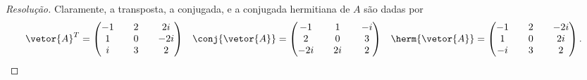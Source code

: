 \begin{proof}[Resolução]
    Claramente, a transposta, a conjugada, e a conjugada hermitiana de \(A\) são dadas por
    \begin{align*}
        \vetor{A}^T &= \begin{pmatrix}
            -1 && 2 && 2i\\
            1 && 0 &&-2i\\
            i && 3 && 2
        \end{pmatrix}&
            \conj{\vetor{A}} &= \begin{pmatrix}
            -1 && 1 &&-i\\
            2 && 0 && 3\\
            -2i && 2i&& 2
       \end{pmatrix}&
            \herm{\vetor{A}} &= \begin{pmatrix}
            -1 && 2 &&-2i\\
            1 && 0 && 2i\\
            -i && 3 && 2
       \end{pmatrix}.
    \end{align*}


\end{proof}
